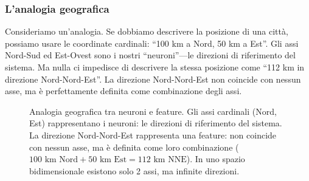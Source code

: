 \subsubsection{L'analogia geografica}
Consideriamo un'analogia. Se dobbiamo descrivere la posizione di una città, possiamo usare le coordinate cardinali: ``100 km a Nord, 50 km a Est''. Gli assi Nord-Sud ed Est-Ovest sono i nostri ``neuroni''—le direzioni di riferimento del sistema. Ma nulla ci impedisce di descrivere la stessa posizione come ``112 km in direzione Nord-Nord-Est''. La direzione Nord-Nord-Est non coincide con nessun asse, ma è perfettamente definita come combinazione degli assi.
\begin{figure}[htbp]
    \centering
    
    \caption{Analogia geografica tra neuroni e feature. Gli assi cardinali (Nord, Est) rappresentano i neuroni: le direzioni di riferimento del sistema. La direzione Nord-Nord-Est rappresenta una feature: non coincide con nessun asse, ma è definita come loro combinazione ($100 \text{ km Nord} + 50 \text{ km Est} = 112 \text{ km NNE}$). In uno spazio bidimensionale esistono solo 2 assi, ma infinite direzioni.}
    \label{fig:geographic_analogy}
\end{figure}
